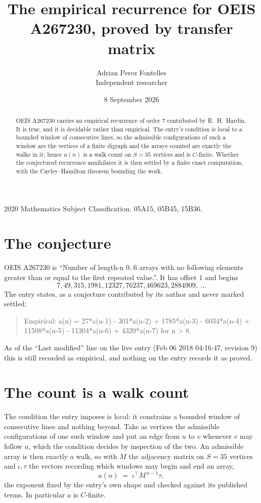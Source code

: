 \documentclass[11pt,a4paper]{article}
\title{The empirical recurrence for OEIS A267230, proved by transfer matrix}
\author{Adrian Perez Fontelles\\ \small Independent researcher}
\date{8 September 2026}
\theoremstyle{plain}
\theoremstyle{definition}
\begin{document}
\maketitle

\begin{abstract}
OEIS A267230 carries an empirical recurrence of order $7$ contributed by R.~H.~Hardin. It is
true, and it is decidable rather than empirical. The entry's condition is local to a bounded window of consecutive lines, so
the admissible configurations of such a window are the vertices of a finite digraph and the
arrays counted are exactly the walks in it; hence $a(n)$ is a walk count on $S=35$ vertices
and is $C$-finite. Whether the conjectured recurrence annihilates it is then settled by a
finite exact computation, with the Cayley--Hamilton theorem bounding the work.
\end{abstract}

\noindent\small 2020 Mathematics Subject Classification. 05A15, 05B45, 15B36.\normalsize

\section{The conjecture}

OEIS A267230 is ``Number of length-n 0..6 arrays with no following elements greater than or equal to the first repeated value.''. It has offset $1$ and begins
\[
7, 49, 315, 1981, 12327, 76237, 469623, 2884909,\ \dots
\]
The entry states, as a conjecture contributed by its author and never marked settled:
\begin{quote}
Empirical: a(n) = 27*a(n-1) - 301*a(n-2) + 1785*a(n-3) - 6034*a(n-4) + 11508*a(n-5) - 11304*a(n-6) + 4320*a(n-7) for n > 8.
\end{quote}
As of the ``Last modified'' line on the live entry (Feb 06 2018 04:16:47, revision 9) this is still
recorded as empirical, and nothing on the entry records it as proved.

\section{The count is a walk count}

The condition the entry imposes is local: it constrains a bounded window of consecutive lines and nothing beyond. Take as
vertices the admissible configurations of one such window and put an edge from $u$ to $v$
whenever $v$ may follow $u$, which the condition decides by inspection of the two. An
admissible array is then exactly a walk, so with $M$ the adjacency matrix on $S=35$ vertices
and $\iota,\tau$ the vectors recording which windows may begin and end an array,
\[
a(n)\;=\;\iota^{\!\top}M^{\,n-1}\tau ,
\]
the exponent fixed by the entry's own shape and checked against its published terms. In
particular $a$ is $C$-finite.
\end{document}

